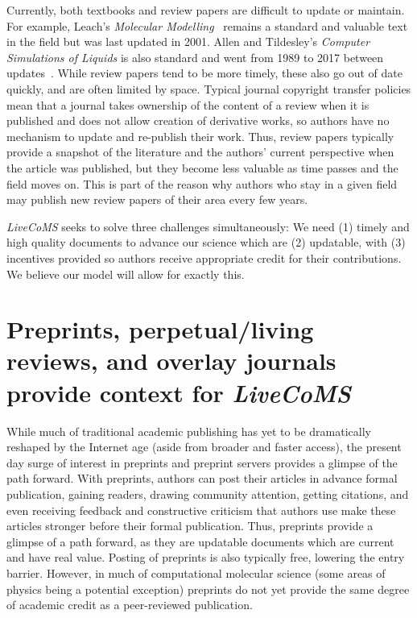 \documentclass[9pt,editorial]{livecoms}
\begin{document}
Currently, both textbooks and review papers are difficult to update or maintain.
For example, Leach's \emph{Molecular Modelling}~\cite{Leach:2001:} remains a standard and valuable text in the field but was last updated in 2001.
Allen and Tildesley's \emph{Computer Simulations of Liquids} is also standard and went from 1989 to 2017 between updates~\cite{allen_computer_2017}. 
While review papers tend to be more timely, these also go out of date quickly, and are often limited by space. 
Typical journal copyright transfer policies mean that a journal takes ownership of the content of a review when it is published and does not allow creation of derivative works, so authors have no mechanism to update and re-publish their work.
Thus, review papers typically provide a snapshot of the literature and the authors' current perspective when the article was published, but they become less valuable as time passes and the field moves on.
This is part of the reason why authors who stay in a given field may publish new review papers of their area every few years. 

\emph{LiveCoMS} seeks to solve three challenges simultaneously: We need (1) timely and high quality documents to advance our science which are (2) updatable, with (3) incentives provided so authors receive appropriate credit for their contributions.
We believe our model will allow for exactly this. 

\section{Preprints, perpetual/living reviews, and overlay journals provide context for \emph{LiveCoMS}}

While much of traditional academic publishing has yet to be dramatically reshaped by the Internet age (aside from broader and faster access), the present day surge of interest in preprints and preprint servers provides a glimpse of the path forward.
With preprints, authors can post their articles in advance formal publication, gaining readers, drawing community attention, getting citations, and even receiving feedback and constructive criticism that authors use make these articles stronger before their formal publication.
Thus, preprints provide a glimpse of a path forward, as they are updatable documents which are current and have real value.
Posting of preprints is also typically free, lowering the entry barrier. 
However, in much of computational molecular science (some areas of physics being a potential exception) preprints do not yet provide the same degree of academic credit as a peer-reviewed publication. 
\end{document}
